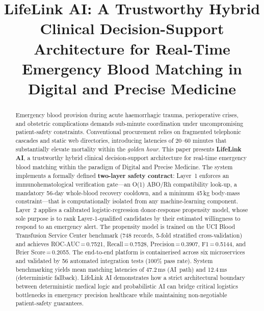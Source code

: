 \documentclass[conference]{IEEEtran}
\begin{document}
\title{LifeLink AI: A Trustworthy Hybrid Clinical Decision-Support
Architecture for Real-Time Emergency Blood Matching in Digital and
Precise Medicine}

\author{%
}

\maketitle

\begin{abstract}
Emergency blood provision during acute haemorrhagic trauma, perioperative
crises, and obstetric complications demands sub-minute coordination under
uncompromising patient-safety constraints. Conventional procurement relies
on fragmented telephonic cascades and static web directories, introducing
latencies of 20--60 minutes that substantially elevate mortality within
the \emph{golden hour}. This paper presents \textbf{LifeLink AI}, a
trustworthy hybrid clinical decision-support architecture for real-time
emergency blood matching within the paradigm of Digital and Precise
Medicine. The system implements a formally defined \textbf{two-layer
safety contract}: Layer~1 enforces an immunohematological verification
gate---an O(1) ABO/Rh compatibility look-up, a mandatory 56-day
whole-blood recovery cooldown, and a minimum 45\,kg body-mass
constraint---that is computationally isolated from any machine-learning
component. Layer~2 applies a calibrated logistic-regression
donor-response propensity model, whose sole purpose is to rank
Layer-1-qualified candidates by their estimated willingness to respond
to an emergency alert. The propensity model is trained on the UCI Blood
Transfusion Service Center benchmark (748 records, 5-fold stratified
cross-validation) and achieves ROC-AUC\,=\,0.7521, Recall\,=\,0.7528,
Precision\,=\,0.3907, F1\,=\,0.5144, and Brier Score\,=\,0.2055.
The end-to-end platform is containerised across six microservices and
validated by 56 automated integration tests (100\% pass rate). System
benchmarking yields mean matching latencies of 47.2\,ms (AI~path)
and 12.4\,ms (deterministic fallback). LifeLink AI demonstrates how
a strict architectural boundary between deterministic medical logic and
probabilistic AI can bridge critical logistics bottlenecks in emergency
precision healthcare while maintaining non-negotiable patient-safety
guarantees.
\end{abstract}
\end{document}
